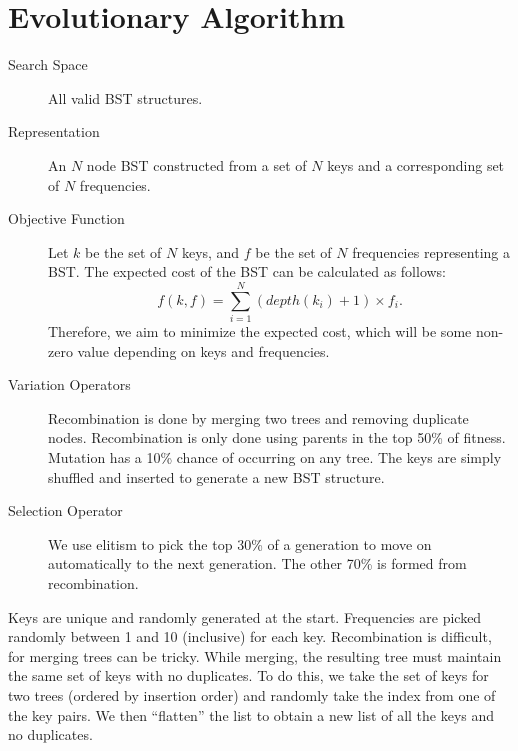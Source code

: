
\section{Evolutionary Algorithm}
\label{sec-algorithm}

\begin{description}
    \item[Search Space] All valid BST structures.
    \item[Representation] An $N$ node BST constructed from a set of $N$ keys and a corresponding set of $N$ frequencies.
    \item[Objective Function] Let $k$ be the set of $N$ keys, and $f$ be the set of $N$ frequencies representing a BST. The expected cost of the BST can be calculated as follows:
    \begin{equation*}
        f(k, f) = \sum_{i=1}^{N} (depth(k_i) + 1) \times f_i.
    \end{equation*}
    Therefore, we aim to minimize the expected cost, which will be some non-zero value depending on keys and frequencies.
    \item[Variation Operators] Recombination is done by merging two trees and removing duplicate nodes. Recombination is only done using parents in the top 50\% of fitness. Mutation has a 10\% chance of occurring on any tree. The keys are simply shuffled and inserted to generate a new BST structure.
    \item[Selection Operator] We use elitism to pick the top 30\% of a generation to move on automatically to the next generation. The other 70\% is formed from recombination.
\end{description}

Keys are unique and randomly generated at the start. Frequencies are picked randomly between 1 and 10 (inclusive) for each key. Recombination is difficult, for merging trees can be tricky. While merging, the resulting tree must maintain the same set of keys with no duplicates. To do this, we take the set of keys for two trees (ordered by insertion order) and randomly take the index from one of the key pairs. We then ``flatten'' the list to obtain a new list of all the keys and no duplicates.
